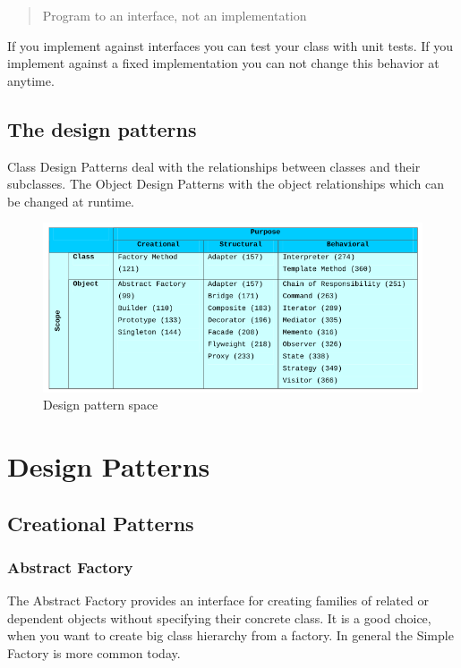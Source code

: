 \documentclass[11pt]{article}
\begin{document}
\begin{quote}
Program to an interface, not an implementation
\end{quote}
If you implement against interfaces you can test your class with unit tests.
If you implement against a fixed implementation you can not change this behavior at anytime.

\subsection{The design patterns}
\label{sec:orge2aab83}

Class Design Patterns deal with the relationships between classes and their subclasses.
The Object Design Patterns with the object relationships which can be changed at runtime.

\begin{figure}[htbp]
\centering
\includegraphics[width=.9\linewidth]{img/design_pattern_space.png}
\caption{\label{fig:design-pattern-space}Design pattern space}
\end{figure}


\section{Design Patterns}
\label{sec:orgb1fde5f}
\subsection{Creational Patterns}
\label{sec:org5f4b61d}
\subsubsection{Abstract Factory}
\label{sec:orgf8ec2d3}
The Abstract Factory provides an interface for creating families of related or dependent objects without specifying their concrete class.
It is a good choice, when you want to create big class hierarchy from a factory.
In general the Simple Factory is more common today.
\end{document}
